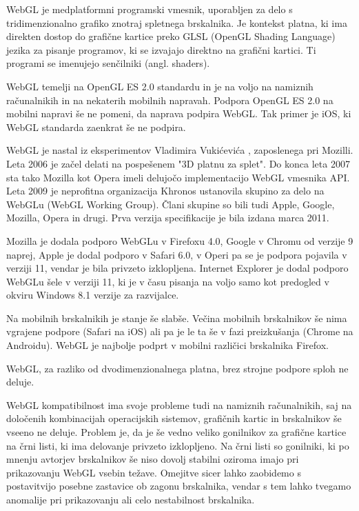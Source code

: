 WebGL \cite{webgl} je medplatformni programski vmesnik, uporabljen za delo s tridimenzionalno grafiko znotraj spletnega brskalnika. Je kontekst platna, ki ima direkten dostop do grafične kartice preko GLSL (OpenGL Shading Language) jezika za pisanje programov, ki se izvajajo direktno na grafični kartici. Ti programi se imenujejo senčilniki (angl. shaders). 

WebGL temelji na OpenGL ES 2.0 standardu in je na voljo na namiznih računalnikih in na nekaterih mobilnih napravah. Podpora OpenGL ES 2.0 na mobilni napravi še ne pomeni, da naprava podpira WebGL. Tak primer je iOS, ki WebGL standarda zaenkrat še ne podpira.

WebGL je nastal iz eksperimentov Vladimira Vukićevića \cite{vlad1}, zaposlenega pri Mozilli. Leta 2006 je začel delati na pospešenem "3D platnu za splet". Do konca leta 2007 sta tako Mozilla kot Opera imeli delujočo implementacijo WebGL vmesnika API. Leta 2009 je neprofitna organizacija Khronos ustanovila skupino za delo na WebGLu (WebGL Working Group). Člani skupine so bili tudi Apple, Google, Mozilla, Opera in drugi. Prva verzija specifikacije je bila izdana marca 2011.

Mozilla je dodala podporo WebGLu v Firefoxu 4.0, Google v Chromu od verzije 9 naprej, Apple je dodal podporo v Safari 6.0, v Operi pa se je podpora pojavila v verziji 11, vendar je bila privzeto izklopljena. Internet Explorer je dodal podporo WebGLu šele v verziji 11, ki je v času pisanja na voljo samo kot predogled v okviru Windows 8.1 verzije za razvijalce.

Na mobilnih brskalnikih je stanje še slabše. Večina mobilnih brskalnikov še nima vgrajene podpore (Safari na iOS) ali pa je le ta še v fazi preizkušanja (Chrome na Androidu). WebGL je najbolje podprt v mobilni različici brskalnika Firefox.

WebGL, za razliko od dvodimenzionalnega platna, brez strojne podpore sploh ne deluje. 

WebGL kompatibilnost ima svoje probleme tudi na namiznih računalnikih, saj na določenih kombinacijah operacijskih sistemov, grafičnih kartic in brskalnikov še vseeno ne deluje. Problem je, da je še vedno veliko gonilnikov za grafične kartice na črni listi, ki ima delovanje privzeto izklopljeno. Na črni listi so gonilniki, ki po mnenju avtorjev brskalnikov še niso dovolj stabilni oziroma imajo pri prikazovanju WebGL vsebin težave. Omejitve sicer lahko zaobidemo s postavitvijo posebne zastavice ob zagonu brskalnika, vendar s tem lahko tvegamo anomalije pri prikazovanju ali celo nestabilnost brskalnika.

